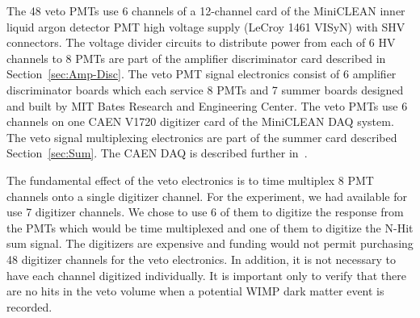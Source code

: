 \documentclass[review,number,sort&compress]{elsarticle}
\begin{document}
The 48 veto PMTs use 6 channels of a 12-channel card of the
MiniCLEAN inner liquid argon detector PMT high voltage supply (LeCroy 1461 VISyN)
with SHV connectors. The voltage divider circuits to distribute power
from each of 6 HV channels to 8 PMTs are part of the amplifier
discriminator card described in Section~\ref{sec:Amp-Disc}. The veto
PMT signal electronics consist of 6 amplifier discriminator boards which each service
8 PMTs and 7 summer boards designed and built by MIT Bates Research and Engineering Center.
The veto PMTs use 6 channels on one CAEN V1720 digitizer
card of the MiniCLEAN DAQ system. The veto signal multiplexing
electronics are part of the summer card described
Section~\ref{sec:Sum}. The CAEN DAQ is described further
in~\cite{ref:gastler_thesis}.

The fundamental effect of the veto electronics is to time multiplex 8 PMT channels
onto a single digitizer channel. For the experiment, we had available for use 7
digitizer channels. We chose to use 6 of them to digitize the response from the
PMTs which would be time multiplexed and one of them to digitize the N-Hit sum
signal. The digitizers are expensive and funding would not permit purchasing 48
digitizer channels for the veto electronics. In addition, it is not necessary to
have each channel digitized individually. It is important only to verify that
there are no hits in the veto volume when a potential WIMP dark matter event is
recorded.
\end{document}
